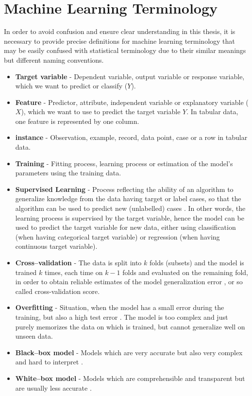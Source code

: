 \section{Machine Learning Terminology}
\label{sec:mlterms}
In order to avoid confusion and ensure clear understanding in this thesis, it is necessary to provide precise definitions for machine learning terminology that may be easily confused with statistical terminology due to their similar meanings but different naming conventions.
\begin{itemize}\setlength\itemsep{0em}
	\item \textbf{Target variable} - Dependent variable, output variable or response variable, which we want to predict or classify ($Y$).
	\item \textbf{Feature} - Predictor, attribute, independent variable or explanatory variable ($X$), which we want to use to predict the target variable $Y$. In tabular data, one feature is represented by one column.
	\item \textbf{instance} - Observation, example, record, data point, case or a row in tabular data.
	\item \textbf{Training} - Fitting process, learning process or estimation of the model's parameters using the training data.
	\item \textbf{Supervised Learning} - Process reflecting the ability of an algorithm to generalize knowledge from the data having target or label cases, so that the algorithm can be used to predict new (unlabelled) cases \citep{berry2020supervised}.
    In other words, the learning process is supervised by the target variable, hence the model can be used to predict the target variable for new data, either using classification (when having categorical target variable) or regression (when having continuous target variable).
	\item \textbf{Cross--validation} - The data is split into $k$ folds (subsets) and the model is trained $k$ times, each time on $k-1$ folds and evaluated on the remaining fold, in order to obtain reliable estimates of the model generalization error \citep{tatsat2020machine}, or so called cross-validation score.
	\item \textbf{Overfitting} - Situation, when the model has a small error during the training, but also a high test error \citep{forsyth2019applied}. The model is too complex and just purely memorizes the data on which is trained, but cannot generalize well on unseen data.
	\item \textbf{Black--box model} - Models which are very accurate but also very complex and hard to interpret \citep{pintelas2020grey}.
	\item \textbf{White--box model} -  Models which are comprehensible and transparent but are usually less accurate  \citep{pintelas2020grey}.
\end{itemize}
\newpage


